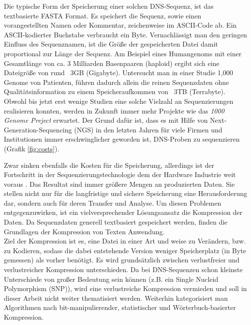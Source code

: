 \documentclass[12pt]{article}
\begin{document}
Die typische Form der Speicherung einer solchen DNS-Sequenz, ist das textbasierte FASTA Format. Es speichert die Sequenz, sowie einen vorangestellten Namen oder Kommentar, zeichenweise im ASCII-Code ab. Ein ASCII-kodierter Buchstabe verbraucht ein Byte. Vernachlässigt man den geringen Einfluss des Sequenznamen, ist die Größe der gespeicherten Datei damit proportional zur Länge der Sequenz. Am Beispiel eines Humangenoms mit einer Gesamtlänge von ca. 3 Milliarden Basenpaaren (haploid) ergibt sich eine Dateigröße von rund ~3GB (Gigabyte). Untersucht man in einer Studie 1,000 Genome von Patienten, führen dadurch allein die reinen Sequenzdaten ohne Qualitätsinformation zu einem Speicheraufkommen von ~3TB (Terrabyte). Obwohl bis jetzt erst wenige Studien eine solche Vielzahl an Sequenzierungen realisieren konnten, werden in Zukunft immer mehr Projekte wie das \textit{1000 Genome Preject}\cite{1000genomes} erwartet. Der Grund dafür ist, dass es mit Hilfe von Next-Generation-Sequencing (NGS) in den letzten Jahren für viele Firmen und Institutionen immer erschwinglicher geworden ist, DNS-Proben zu sequenzieren (Grafik \ref{fig:costs}).

Zwar sinken ebenfalls die Kosten für die Speicherung, allerdings ist der Fortschritt in der Sequenzierungstechnologie dem der Hardware Industrie weit voraus \cite{sequencingCosts}.  Das Resultat sind immer größere Mengen an produzierten Daten. Sie stellen nicht nur für die langfristige und sichere Speicherung eine Herausforderung dar, sondern auch für deren Transfer und Analyse. Um diesen Problemen entgegenzuwirken, ist ein vielversprechender Lösungsansatz die Kompression der Daten. Da Sequenzdaten generell textbasiert gespeichert werden, finden die Grundlagen der Kompression von Texten Anwendung. \\

Ziel der Kompression ist es, eine Datei in einer Art und weise zu Verändern, bzw. zu Kodieren, sodass die dabei entstehende Version weniger Speicherplatz (in Byte gemessen) als vorher benötigt. Es wird grundsätzlich zwischen verlustfreier und verlustreicher Kompression unterschieden. Da bei DNS-Sequenzen schon kleinste Unterschiede von großer Bedeutung sein können (z.B. ein Single Nucleid Polymorphism (SNP)), wird eine verlustreiche Kompression vermieden und soll in dieser Arbeit nicht weiter thematisiert werden. Weiterhin kategorisiert man Algorithmen nach bit-manipulierender, statistischer und Wörterbuch-basierter Kompression.
\end{document}
